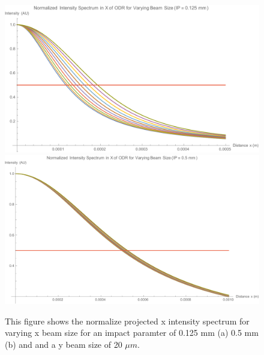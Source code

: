 \documentclass[12pt]{article}
\begin{document}
\begin{figure}
\begin{center}
\includegraphics[scale=0.5]{figures/ODR_Norm_IntensityX_125.PDF}
\includegraphics[scale=0.5]{figures/ODR_Norm_IntensityX_500.PDF}
\caption{This figure shows the normalize projected x intensity spectrum for varying x beam size for an impact paramter of 0.125 mm (a) 0.5 mm (b) and and a y beam size of 20 $\mu m$.}
\end{center}
\end{figure}
\end{document}
